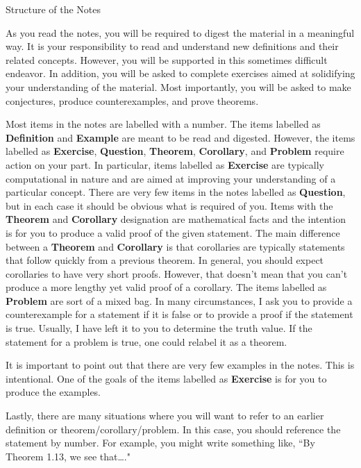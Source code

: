 \begin{section*}{Structure of the Notes}

As you read the notes, you will be required to digest the material in a meaningful way.  It is your responsibility to read and understand new definitions and their related concepts.  However, you will be supported in this sometimes difficult endeavor. In addition, you will be asked to complete exercises aimed at solidifying your understanding of the material.  Most importantly, you will be asked to make conjectures, produce counterexamples, and prove theorems.

Most items in the notes are labelled with a number.  The items labelled as \textbf{Definition} and \textbf{Example} are meant to be read and digested.  However, the items labelled as \textbf{Exercise}, \textbf{Question}, \textbf{Theorem}, \textbf{Corollary}, and \textbf{Problem} require action on your part.  In particular, items labelled as \textbf{Exercise} are typically computational in nature and are aimed at improving your understanding of a particular concept.  There are very few items in the notes labelled as \textbf{Question}, but in each case it should be obvious what is required of you.  Items with the \textbf{Theorem} and \textbf{Corollary} designation are mathematical facts and the intention is for you to produce a valid proof of the given statement.  The main difference between a \textbf{Theorem} and \textbf{Corollary} is that corollaries are typically statements that follow quickly from a previous theorem.  In general, you should expect corollaries to have very short proofs.  However, that doesn't mean that you can't produce a more lengthy yet valid proof of a corollary.  The items labelled as \textbf{Problem} are sort of a mixed bag.  In many circumstances, I ask you to provide a counterexample for a statement if it is false or to provide a proof if the statement is true.  Usually, I have left it to you to determine the truth value.  If the statement for a problem is true, one could relabel it as a theorem.

It is important to point out that there are very few examples in the notes.  This is intentional.  One of the goals of the items labelled as \textbf{Exercise} is for you to produce the examples.

Lastly, there are many situations where you will want to refer to an earlier definition or theorem/corollary/problem.  In this case, you should reference the statement by number.  For example, you might write something like, ``By Theorem 1.13, we see that\ldots."

\end{section*}

